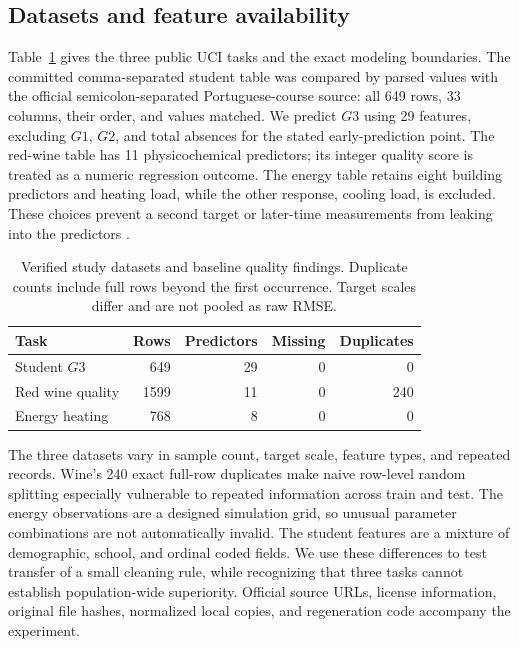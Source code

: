 \documentclass[conference]{IEEEtran}
\begin{document}
\subsection{Datasets and feature availability}
Table~\ref{tab:datasets} gives the three public UCI tasks and the exact modeling boundaries. The committed comma-separated student table was compared by parsed values with the official semicolon-separated Portuguese-course source: all 649 rows, 33 columns, their order, and values matched. We predict $G3$ using 29 features, excluding $G1$, $G2$, and total absences for the stated early-prediction point. The red-wine table has 11 physicochemical predictors; its integer quality score is treated as a numeric regression outcome. The energy table retains eight building predictors and heating load, while the other response, cooling load, is excluded. These choices prevent a second target or later-time measurements from leaking into the predictors \cite{Cortez2008,Cortez2014,Kaufman2012}.

\begin{table}[t]\centering\caption{Verified study datasets and baseline quality findings. Duplicate counts include full rows beyond the first occurrence. Target scales differ and are not pooled as raw RMSE.}\label{tab:datasets}\footnotesize
\begin{tabular}{lrrrr}\toprule
Task & Rows & Predictors & Missing & Duplicates\\\midrule
Student $G3$ & 649 & 29 & 0 & 0\\
Red wine quality & 1599 & 11 & 0 & 240\\
Energy heating & 768 & 8 & 0 & 0\\\bottomrule
\end{tabular}
\end{table}

The three datasets vary in sample count, target scale, feature types, and repeated records. Wine's 240 exact full-row duplicates make naive row-level random splitting especially vulnerable to repeated information across train and test. The energy observations are a designed simulation grid, so unusual parameter combinations are not automatically invalid. The student features are a mixture of demographic, school, and ordinal coded fields. We use these differences to test transfer of a small cleaning rule, while recognizing that three tasks cannot establish population-wide superiority. Official source URLs, license information, original file hashes, normalized local copies, and regeneration code accompany the experiment.
\end{document}
